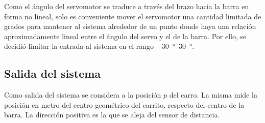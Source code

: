 Como el ángulo del servomotor se traduce a través del brazo hacia la barra en forma no lineal, solo es conveniente mover el servomotor una cantidad limitada de grados para mantener al sistema alrededor de un punto donde haya una relación aproximadamente lineal entre el ángulo del servo y el de la barra. Por ello, se decidió limitar la entrada al sistema en el rango \qtyrange{-30}{30}{\degree}.

\subsection{Salida del sistema}

Como salida del sistema se considera a la posición $p$ del carro. La misma mide la posición en metro del centro geométrico del carrito, respecto del centro de la barra. La dirección positiva es la que se aleja del sensor de distancia.


